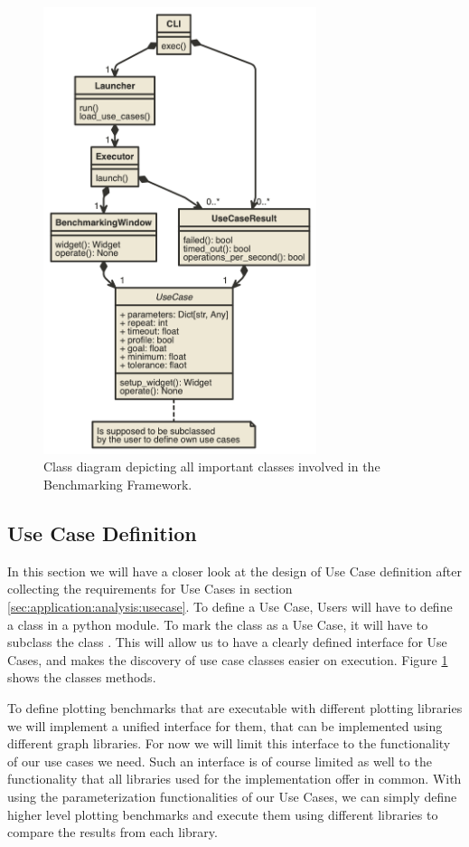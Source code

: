 \begin{figure}[h]
    \centering
    \includegraphics[width=8cm]{resources/img/class/widgetmark}
    \caption{
        Class diagram depicting all important classes involved in the
        Benchmarking Framework. 
    }
    \label{fig:application:design:classdiagram:widgetmark}
\end{figure}

\clearpage

\subsection{Use Case Definition}

\label{sec:application:design:usecases}

In this section we will have a closer look at the design of Use Case definition
after collecting the requirements for Use Cases in section
\ref{sec:application:analysis:usecase}. To define a Use Case, Users will have to
define a class in a python module. To mark the class as a Use Case, it will have
to subclass the class . This will allow us to have a
clearly defined interface for Use Cases, and makes the discovery of use case
classes easier on execution. Figure
\ref{fig:application:design:classdiagram:widgetmark} shows the classes methods.

To define plotting benchmarks that are executable with different plotting
libraries we will implement a unified interface for them, that can be
implemented using different graph libraries. For now we will limit this
interface to the functionality of our use cases we need. Such an interface is of
course limited as well to the functionality that all libraries used for the
implementation offer in common. With using the parameterization functionalities
of our Use Cases, we can simply define higher level plotting benchmarks and
execute them using different libraries to compare the results from each library.

